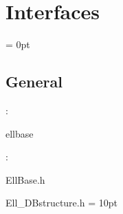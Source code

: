 
\section{Interfaces} 


\parskip = 0pt

\vspace{3mm} \subsection*{General}

: 

ellbase
\vspace{2mm}

\vspace{5mm}

: 



EllBase.h

Ell\_DBstructure.h
\vspace{2mm}\parskip = 10pt 
